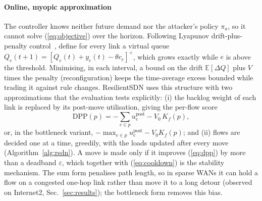 \paragraph{Online, myopic approximation}
The controller knows neither future demand nor the attacker's policy $\pi_a$, so it cannot solve
(\ref{eq:objective}) over the horizon. Following Lyapunov drift-plus-penalty
control~\cite{neely2010stochastic}, define for every link a virtual queue
$Q_e(t+1)=[Q_e(t)+y_e(t)-\theta c_e]^+$, which grows exactly while $e$ is above the threshold.
Minimising, in each interval, a bound on the drift $\mathbb{E}[\Delta Q]$ plus $V$ times the
penalty (reconfiguration) keeps the time-average excess bounded while trading it against rule
changes. ResilientSDN uses this structure with two approximations that the evaluation tests
explicitly: (i) the backlog weight of each link is replaced by its post-move utilisation, giving
the per-flow score
\begin{equation}
  \mathrm{DPP}(p)=-\sum_{e\in p}u_e^{\mathrm{post}}-V_0\,K_f(p),
  \label{eq:dpp}
\end{equation}
or, in the bottleneck variant, $-\max_{e\in p}u_e^{\mathrm{post}}-V_0K_f(p)$;
and (ii) flows are decided one at a time, greedily, with the loads updated after every move
(Algorithm~\ref{alg:rsdn}). A move is made only if it improves (\ref{eq:dpp}) by more than a
deadband $\varepsilon$, which together with (\ref{eq:cooldown}) is the stability mechanism.
The sum form penalises path length, so in sparse WANs it can hold a flow on a congested one-hop
link rather than move it to a long detour (observed on Internet2, Sec.~\ref{sec:results}); the
bottleneck form removes this bias.

